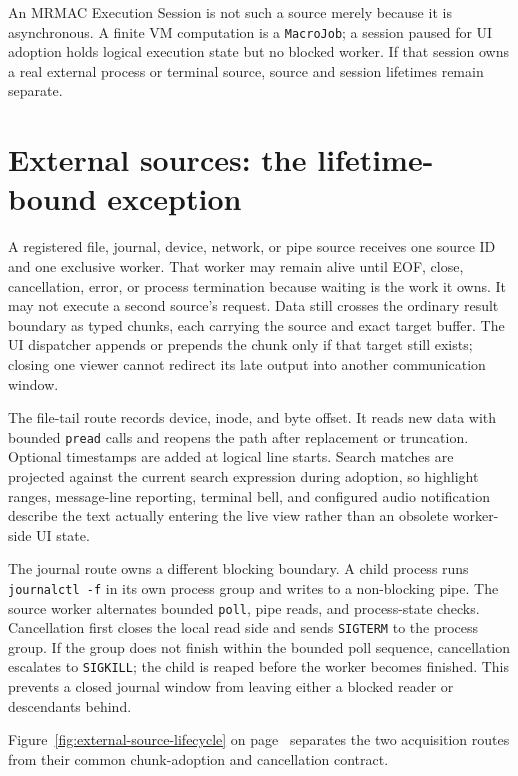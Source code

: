 \documentclass[a4paper,10pt,twoside,openany]{book}
\begin{document}
An MRMAC Execution Session is not such a source merely because it is
asynchronous. A finite VM computation is a \texttt{MacroJob}; a session paused
for UI adoption holds logical execution state but no blocked worker. If that
session owns a real external process or terminal source, source and session
lifetimes remain separate.

\section{External sources: the lifetime-bound exception}
\label{sec:external-source-lifetime}

A registered file, journal, device, network, or pipe source receives one source
ID and one exclusive worker. That worker may remain alive until EOF, close,
cancellation, error, or process termination because waiting is the work it
owns. It may not execute a second source's request. Data still crosses the
ordinary result boundary as typed chunks, each carrying the source and exact
target buffer. The UI dispatcher appends or prepends the chunk only if that
target still exists; closing one viewer cannot redirect its late output into
another communication window.

The file-tail route records device, inode, and byte offset. It reads new data
with bounded \texttt{pread} calls and reopens the path after replacement or
truncation. Optional timestamps are added at logical line starts. Search
matches are projected against the current search expression during adoption,
so highlight ranges, message-line reporting, terminal bell, and configured
audio notification describe the text actually entering the live view rather
than an obsolete worker-side UI state.

The journal route owns a different blocking boundary. A child process runs
\texttt{journalctl -f} in its own process group and writes to a non-blocking
pipe. The source worker alternates bounded \texttt{poll}, pipe reads, and
process-state checks. Cancellation first closes the local read side and sends
\texttt{SIGTERM} to the process group. If the group does not finish within the
bounded poll sequence, cancellation escalates to \texttt{SIGKILL}; the child
is reaped before the worker becomes finished. This prevents a closed journal
window from leaving either a blocked reader or descendants behind.

Figure~\ref{fig:external-source-lifecycle} on
page~\pageref{fig:external-source-lifecycle} separates the two acquisition
routes from their common chunk-adoption and cancellation contract.
\end{document}
